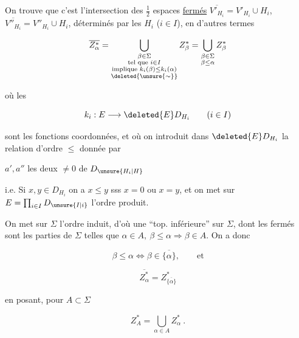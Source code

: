 

On trouve que c'est l'intersection des $\tfrac12$ espaces \uline{fermés} $\overline{V'_{H_i}}=V'_{H_i}\cup H_i$, $\overline{V''_{H_i}}=V''_{H_i}\cup H_i$, déterminés par les $H_i$ ($i\in I$),  en d'autres termes

\[
\overline{Z^*_\alpha}=\bigcup_{\substack{\beta\in\Sigma\\\text{tel que }i\in I\\\text{implique }k_i(\beta)\leq k_i(\alpha)\\\deleted{\unsure{\sim}}}}Z^*_\beta
=\bigcup_{\substack{\beta\in\Sigma\\\beta\leq\alpha}}Z^*_\beta
\]

où les 

\[
k_i:E\longrightarrow\deleted{E}D_{H_i}\qquad(i\in I)
\]

sont les fonctions coordonnées, et où on introduit dans $\deleted{E}D_{H_i}$ la relation d'ordre $\leq$ donnée par


$a',a''$ les deux  $\ne 0$ de $D_{\unsure{H_i|H}}$

i.e. Si $x,y\in D_{H_i}$ on a $x\leq y$ sss $x=0$ ou $x=y$, et on met sur $E=\prod_{i\in I}D_{\unsure{I|i}}$ l'ordre produit.

On  met sur $\Sigma$ l'ordre induit, d'où une ``top. inférieure'' sur $\Sigma$, dont les fermés sont les parties  de $\Sigma$ telles que $\alpha\in A,\ \beta\leq\alpha\Rightarrow\beta\in A$. On a donc

\[
\beta\leq\alpha\iff\beta\in\overline{\{\alpha\}},\qquad\text{et}
\]

\[
\overline{Z^*_\alpha}=Z^*_{\overline{\{\alpha\}}}
\]

en posant, pour $A\subset\Sigma$

\[
Z^*_A=\bigcup_{\alpha\in A}Z^*_\alpha\ .
\]
